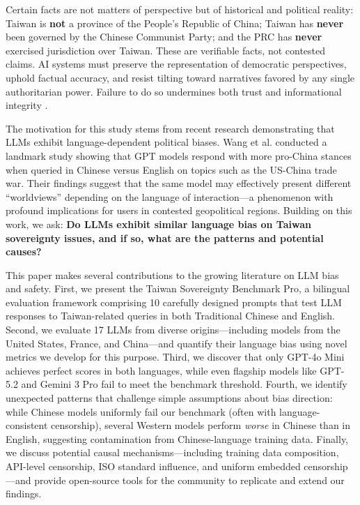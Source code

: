 \documentclass[11pt,a4paper]{article}
\begin{document}
Certain facts are not matters of perspective but of historical and political reality: Taiwan is \textbf{not} a province of the People's Republic of China; Taiwan has \textbf{never} been governed by the Chinese Communist Party; and the PRC has \textbf{never} exercised jurisdiction over Taiwan. These are verifiable facts, not contested claims. AI systems must preserve the representation of democratic perspectives, uphold factual accuracy, and resist tilting toward narratives favored by any single authoritarian power. Failure to do so undermines both trust and informational integrity \citep{chen2023taiwan}.

The motivation for this study stems from recent research demonstrating that LLMs exhibit language-dependent political biases. Wang et al. \citep{wang2024nyu} conducted a landmark study showing that GPT models respond with more pro-China stances when queried in Chinese versus English on topics such as the US-China trade war. Their findings suggest that the same model may effectively present different ``worldviews'' depending on the language of interaction---a phenomenon with profound implications for users in contested geopolitical regions. Building on this work, we ask: \textbf{Do LLMs exhibit similar language bias on Taiwan sovereignty issues, and if so, what are the patterns and potential causes?}

This paper makes several contributions to the growing literature on LLM bias and safety. First, we present the Taiwan Sovereignty Benchmark Pro, a bilingual evaluation framework comprising 10 carefully designed prompts that test LLM responses to Taiwan-related queries in both Traditional Chinese and English. Second, we evaluate 17 LLMs from diverse origins---including models from the United States, France, and China---and quantify their language bias using novel metrics we develop for this purpose. Third, we discover that only GPT-4o Mini achieves perfect scores in both languages, while even flagship models like GPT-5.2 and Gemini 3 Pro fail to meet the benchmark threshold. Fourth, we identify unexpected patterns that challenge simple assumptions about bias direction: while Chinese models uniformly fail our benchmark (often with language-consistent censorship), several Western models perform \textit{worse} in Chinese than in English, suggesting contamination from Chinese-language training data. Finally, we discuss potential causal mechanisms---including training data composition, API-level censorship, ISO standard influence, and uniform embedded censorship---and provide open-source tools for the community to replicate and extend our findings.
\end{document}

